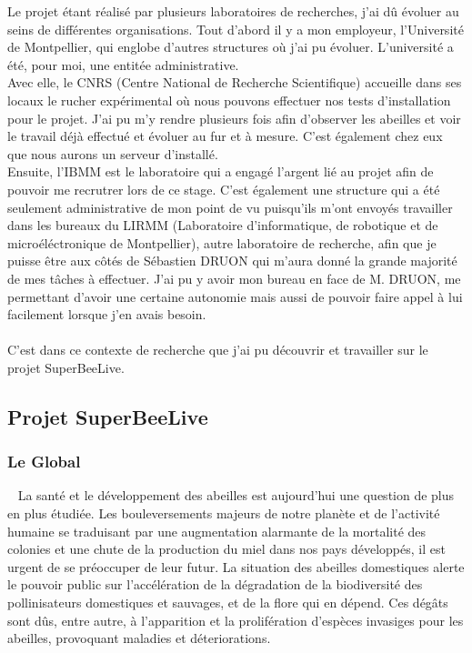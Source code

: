 \documentclass[11pt, french]{report}
\begin{document}
Le projet étant réalisé par plusieurs laboratoires de recherches, j'ai dû évoluer au seins de différentes organisations. 
Tout d'abord il y a mon employeur, l'Université de Montpellier, qui englobe d'autres structures où j'ai pu évoluer. 
L'université a été, pour moi, une entitée administrative. \\ 
Avec elle, le CNRS (Centre National de Recherche Scientifique) accueille dans ses locaux le rucher expérimental où 
nous pouvons effectuer nos tests d'installation pour le projet. J'ai pu m'y rendre plusieurs fois afin d'observer les abeilles
et voir le travail déjà effectué et évoluer au fur et à mesure. C'est également chez eux que nous aurons un serveur d'installé.\\
Ensuite, l'IBMM est le laboratoire qui a engagé l'argent lié au projet afin de pouvoir me recrutrer lors de ce stage. 
C'est également une structure qui a été seulement administrative de mon point de vu puisqu'ils m'ont envoyés travailler dans 
les bureaux du LIRMM (Laboratoire d'informatique, de robotique et de microéléctronique de Montpellier), autre laboratoire de 
recherche, afin que je puisse être aux côtés de Sébastien DRUON qui m'aura donné la grande majorité de mes tâches à effectuer. 
J'ai pu y avoir mon bureau en face de M. DRUON, me permettant d'avoir une certaine autonomie mais aussi de pouvoir faire
appel à lui facilement lorsque j'en avais besoin.\\
\\
C'est dans ce contexte de recherche que j'ai pu découvrir et travailler sur le projet SuperBeeLive. \\ 


\subsection{Projet SuperBeeLive}
\subsubsection{Le Global} 
La santé et le développement des abeilles est aujourd’hui une question de plus en plus étudiée. Les bouleversements
majeurs de notre planète et de l’activité humaine se traduisant par une augmentation alarmante de la mortalité
des colonies et une chute de la production du miel dans nos pays développés, il est urgent de se préoccuper de leur futur. 
La situation des abeilles domestiques alerte le pouvoir public sur l’accélération de la dégradation de la biodiversité des 
pollinisateurs domestiques et sauvages, et de la flore qui en dépend. Ces dégâts sont dûs, entre autre, à l’apparition 
et la prolifération d’espèces invasiges pour les abeilles, provoquant maladies et déteriorations. 
\end{document}
